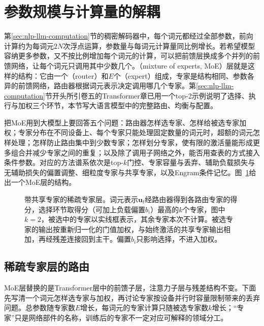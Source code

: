 \section{参数规模与计算量的解耦}
\label{sec:nlp-llm-experts}

第\ref{sec:nlp-llm-computation}节的稠密解码器中，每个词元都经过全部参数，前向计算约为每词元$2N$次浮点运算，参数量与每词元计算量同比例增长。若希望模型容纳更多参数，又不按比例增加每个词元的计算，可以把前馈层换成多个并列的前馈网络，让每个词元只调用其中少数几个。（mixture of experts, MoE）层就是这样的结构：它由一个（router）和$E$个（expert）组成，专家是结构相同、参数各异的前馈网络，路由器根据词元表示决定调用哪几个专家。第\ref{sec:nlp-llm-computation}节开头所引卷五的Transformer章已用一个top-2示例说明了选择、执行与加权三个环节，本节写大语言模型中的完整路由、均衡与配置。

把MoE用到大模型上要回答五个问题：路由器怎样选专家、怎样给被选专家加权；专家分布在不同设备上、每个专家只能处理固定数量的词元时，超额的词元怎样处理；怎样防止路由集中到少数专家；怎样划分专家，使有限的激活量能形成更多组合并减少专家之间的重复；以及除了调用子网络之外，能否用查表的方式接入条件参数。对应的方法谱系依次是top-$k$门控、专家容量与丢弃、辅助负载损失与无辅助损失的偏置调整、细粒度专家与共享专家，以及Engram条件记忆。图~\ref{fig:nlp-llm-moe-layer}给出一个MoE层的结构。

\begin{figure}[!t]
  \centering
  
  \caption{带共享专家的稀疏专家层。词元表示$\bm u_t$经路由器得到各路由专家的得分，选择环节取得分（可加上负载偏置$b_i$）最高的$k$个专家，图中$k=2$，被选中的专家以实线框表示，其余专家本次不计算。被选专家的输出按重新归一化的门值加权，与始终激活的共享专家输出相加，再经残差连接回到主干。偏置$b_i$只影响选择，不进入加权。}
  \label{fig:nlp-llm-moe-layer}
\end{figure}

\subsection{稀疏专家层的路由}
\label{sec:nlp-llm-moe-routing}

MoE层替换的是Transformer层中的前馈子层，注意力子层与残差结构不变。下面先写清一个词元怎样选专家与加权，再讨论专家按设备并行时容量限制带来的丢弃问题。总参数随专家数$E$增长，每词元的专家计算只随被选专家数$k$增长；“专家”只是网络部件的名称，训练后的专家不一定对应可解释的领域分工。

